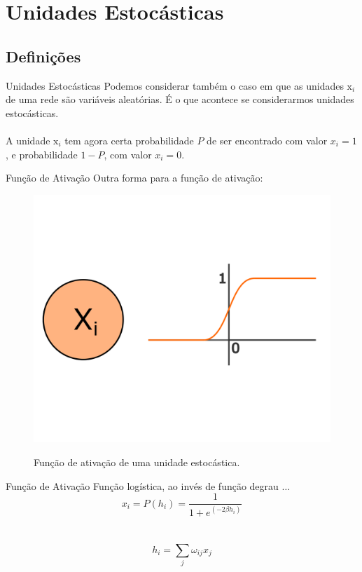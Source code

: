 \section{Unidades Estocásticas}

\subsection{Definições}
\begin{frame}{Unidades Estocásticas}%
  \justifying%
  Podemos considerar também o caso em que as unidades $\mathrm{x}_{i}$ de uma rede são variáveis aleatórias. É o que acontece se considerarmos unidades estocásticas.
  \\~\\
  A unidade $\mathrm{x}_{i}$ tem agora certa probabilidade $P$ de ser encontrado com valor $x_{i} = 1$, e probabilidade $1 - P$, com valor $x_{i} = 0$.
\end{frame}

\begin{frame}{Função de Ativação}%
  \justifying%
  Outra forma para a função de ativação:
  \begin{figure}[h]{}%
    \label{fig:stoc-activation}%
    \includegraphics[scale=0.35]{images/stochastic_activation.png}
    \caption{Função de ativação de uma unidade estocástica.}
  \end{figure}
\end{frame}

\begin{frame}{Função de Ativação}%
  \justifying%
  Função logística, ao invés de função degrau $\dots$
  \begin{equation}%
    \label{eq:stoc-prob}
    x_{i} = P(h_{i}) = \frac{1}{1 + e^{(-2\beta h_{i})}}
  \end{equation}
  \\~\\
  \begin{equation}%
    \label{eq:hi}%
    h_{i} = \sum_{j} \omega_{ij} x_{j}
  \end{equation}
\end{frame}

